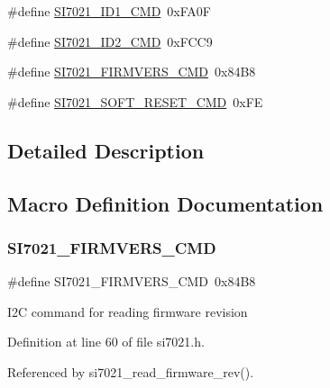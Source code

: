 \begin{DoxyCompactItemize}
\#define \hyperlink{group__SI7021__I2C__CMD_ga4b71181e51a490ca8626758a80a0d14c}{S\+I7021\+\_\+\+I\+D1\+\_\+\+C\+MD}~0x\+F\+A0F
\item 
\#define \hyperlink{group__SI7021__I2C__CMD_ga65ab7ac27fe593eb11f4b0c4c9a16319}{S\+I7021\+\_\+\+I\+D2\+\_\+\+C\+MD}~0x\+F\+C\+C9
\item 
\#define \hyperlink{group__SI7021__I2C__CMD_ga2e429d79e5cca3c05d883b5509a88963}{S\+I7021\+\_\+\+F\+I\+R\+M\+V\+E\+R\+S\+\_\+\+C\+MD}~0x84\+B8
\item 
\#define \hyperlink{group__SI7021__I2C__CMD_ga6d880c26eb3b8bff87e47ee43dd5e8a4}{S\+I7021\+\_\+\+S\+O\+F\+T\+\_\+\+R\+E\+S\+E\+T\+\_\+\+C\+MD}~0x\+FE
\end{DoxyCompactItemize}


\subsection{Detailed Description}


\subsection{Macro Definition Documentation}
\mbox{\label{group__SI7021__I2C__CMD_ga2e429d79e5cca3c05d883b5509a88963}} 
\subsubsection{\texorpdfstring{S\+I7021\+\_\+\+F\+I\+R\+M\+V\+E\+R\+S\+\_\+\+C\+MD}{SI7021\_FIRMVERS\_CMD}}
{\footnotesize\ttfamily \#define S\+I7021\+\_\+\+F\+I\+R\+M\+V\+E\+R\+S\+\_\+\+C\+MD~0x84\+B8}

I2C command for reading firmware revision 

Definition at line 60 of file si7021.\+h.



Referenced by si7021\+\_\+read\+\_\+firmware\+\_\+rev().

\mbox{\label{group__SI7021__I2C__CMD_ga4b71181e51a490ca8626758a80a0d14c}} 
